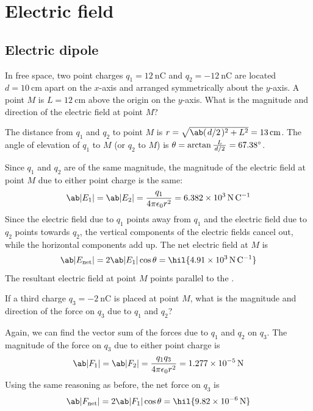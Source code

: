 \chapter{Electric field}

\section{Electric dipole}
\begin{problem}
In free space, two point charges \(q_1 = \qty{+12}{\nano\coulomb}\) and \(q_2 = \qty{-12}{\nano\coulomb}\) are located \(d = \qty{10}{\cm}\) apart on the \(x\)-axis
and arranged symmetrically about the \(y\)-axis. A point \(M\) is \(L = \qty{12}{\cm}\) above the origin on the \(y\)-axis.
What is the magnitude and direction of the electric field at point \(M\)?
\end{problem}
The distance from \(q_1\) and \(q_2\) to point \(M\) is \(r = \sqrt{\ab(\lf{d}{2})^2 + L^2} = \qty{13}{\cm}\).
The angle of elevation of \(q_1\) to \(M\) (or \(q_2\) to \(M\)) is \(\theta = \arctan\f{L}{\lf{d}{2}} = \ang{67.38}\).

Since \(q_1\) and \(q_2\) are of the same magnitude, the magnitude of the electric field at point \(M\) due to either point charge is the same:
\begin{equation*}
	\ab|E_1| = \ab|E_2| = \f{q_1}{4\pi\epsilon_0 r^2} = \qty{6.382e3}{\newton\per\coulomb}
\end{equation*}
Since the electric field due to \(q_1\) points away from \(q_1\) and the electric field due to \(q_2\) points towards \(q_2\), the vertical components of the electric fields cancel out, while the horizontal components add up.
The net electric field at \(M\) is
\begin{equation*}
	\ab|E_\text{net}| = 2\ab|E_1|\cos\theta = \hil{\qty{4.91e3}{\newton\per\coulomb}}
\end{equation*}
The resultant electric field at point \(M\) points parallel to the .

\begin{problem}
If a third charge \(q_3 = \qty{-2}{\nano\coulomb}\) is placed at point \(M\), what is the magnitude and direction of the force on \(q_3\) due to \(q_1\) and \(q_2\)?
\end{problem}
Again, we can find the vector sum of the forces due to \(q_1\) and \(q_2\) on \(q_3\).
The magnitude of the force on \(q_3\) due to either point charge is
\begin{equation*}
	\ab|F_1| = \ab|F_2| = \f{q_1 q_3}{4\pi\epsilon_0 r^2} = \qty{1.277e-5}{\newton}
\end{equation*}
Using the same reasoning as before, the net force on \(q_3\) is
\begin{equation*}
	\ab|F_\text{net}| = 2\ab|F_1|\cos\theta = \hil{\qty{9.82e-6}{\newton}}
\end{equation*}


